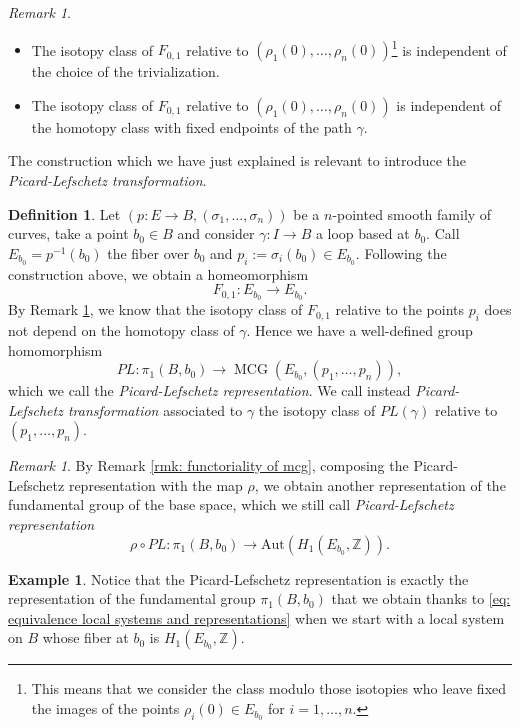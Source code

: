 \documentclass[a4paper,12 pt,titlepage,twoside]{book}
\newcommand{\numberset}{\mathbb}
\newcommand{\Z}{\numberset{Z}}
\DeclareMathOperator{\mcg}{MCG}
\theoremstyle{plain}
\theoremstyle{theorem}
\theoremstyle{definition}
\newtheorem{defn}[thm]{Definition}
\newtheorem{exm}[thm]{Example}
\theoremstyle{remark}
\newtheorem{oss}[thm]{Remark}
\begin{document}
\begin{oss}\label{rmk: independence of picard-lefschetz transformations}
	\begin{itemize}
		\item The isotopy class of $F_{0,1}$ relative to $(\rho_1(0), \dots, \rho_n(0))$\footnote{This means that we consider the class modulo those isotopies who leave fixed the images of the points $\rho_i(0) \in E_{b_0}$ for $i = 1, \dots,n.$} is independent of the choice of the trivialization.
		\item The isotopy class of $F_{0,1}$ relative to $(\rho_1(0), \dots, \rho_n(0))$ is independent of the homotopy class with fixed endpoints of the path $\gamma$.
	\end{itemize}
\end{oss}
The construction which we have just explained is relevant to introduce the \emph{Picard-Lefschetz transformation}.
\begin{defn}
	Let $(p \colon E \rightarrow B, (\sigma_1, \dots, \sigma_n))$ be a $n$-pointed smooth family of curves, take a point $b_0 \in B$ and consider $\gamma \colon I \rightarrow B$ a loop based at $b_0.$ Call $E_{b_0} = p^{-1}(b_0)$ the fiber over $b_0$ and $p_i := \sigma_i(b_0) \in E_{b_0}.$ Following the construction above, we obtain a homeomorphism  $$F_{0,1} \colon E_{b_0} \rightarrow E_{b_0}.$$ By Remark \ref{rmk: independence of picard-lefschetz transformations}, we know that the isotopy class of $F_{0,1}$ relative to the points $p_i$ does not depend on the homotopy class of $\gamma$. Hence we have a well-defined group homomorphism $$PL \colon \pi_1(B,b_0) \rightarrow \mcg(E_{b_0}, (p_1,\dots,p_n)),$$ which we call the \emph{Picard-Lefschetz representation}. We call instead \emph{Picard-Lefschetz transformation} associated to $\gamma$ the isotopy class of $PL(\gamma)$ relative to $(p_1,\dots,p_n)$.
\end{defn}
\begin{oss}
	By Remark \ref{rmk: functoriality of mcg}, composing the Picard-Lefschetz representation with the map $\rho$, we obtain another representation of the fundamental group of the base space, which we still call \emph{Picard-Lefschetz representation} $$\rho\circ PL \colon \pi_1(B,b_0) \rightarrow \text{Aut}(H_1(E_{b_0},\Z)).$$
\end{oss}
\begin{exm}
	Notice that the Picard-Lefschetz representation is exactly the representation of the fundamental group $\pi_1(B,b_0)$ that we obtain thanks to \eqref{eq: equivalence local systems and representations} when we start with a local system on $B$ whose fiber at $b_0$ is $H_1(E_{b_0},\Z).$
\end{exm}
\end{document}
